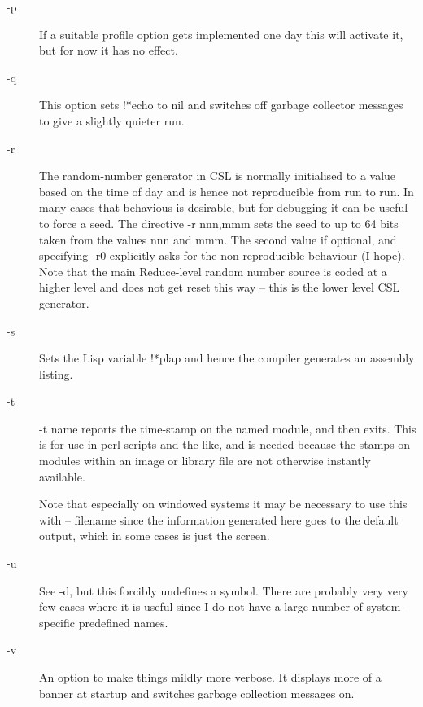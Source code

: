 \documentclass[a4paper,11pt]{article}
\begin{document}
\begin{description}
\item [{\ttfamily -p}] 
If a suitable profile option gets implemented one day this will activate it,
but for now it has no effect.

\item [{\ttfamily -q}] 
This option sets {\ttfamily !*echo} to {\ttfamily nil} and switches off
garbage collector messages to give a slightly quieter run.

\item [{\ttfamily -r}] 
The random-number generator in CSL is normally initialised to a value
based on the time of day and is hence not reproducible from run to run.
In many cases that behavious is desirable, but for debugging it can be useful
to force a seed. The directive {\ttfamily -r nnn,mmm} sets the seed to
up to 64 bits taken from the values nnn and mmm. The second value if optional,
and specifying {\ttfamily -r0}  explicitly asks for the non-reproducible
behaviour (I hope). Note that the main Reduce-level random number source is
coded at a higher level and does not get reset this way -- this is the
lower level CSL generator.

\item [{\ttfamily -s}] 
Sets the Lisp variable {\ttfamily !*plap} and hence the compiler generates
an assembly listing.

\item [{\ttfamily -t}] 
{\ttfamily -t name} reports the time-stamp on the named module, and then
exits. This is for use in perl scripts and the like, and is
needed because the stamps on modules within an image or
library file are not otherwise instantly available.
  
Note that especially on windowed systems it may be necessary to use this
with {\ttfamily -- filename} since the information generated here goes to
the default output, which in some cases is just the screen.

\item [{\ttfamily -u}] 
See {\ttfamily -d}, but this forcibly undefines a symbol. There are probably
very very few cases where it is useful since I do not have a large
number of system-specific predefined names.

\item [{\ttfamily -v}] 
An option to make things mildly more verbose. It displays more of a banner
at startup and switches garbage collection messages on.


\end{description}
\end{document}
